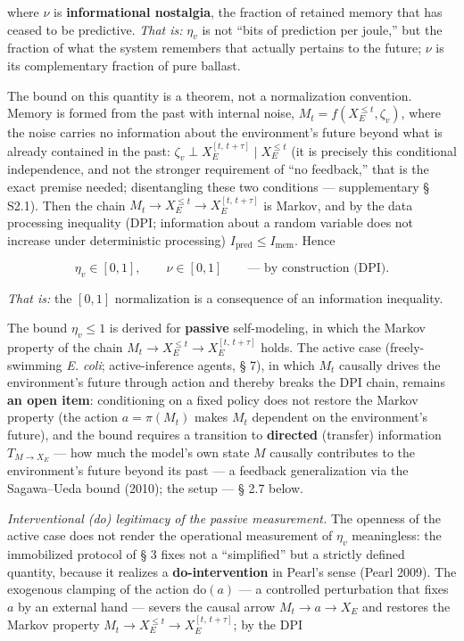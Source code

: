 \documentclass[pdflatex,sn-mathphys-ay]{sn-jnl}
\begin{document}
where \(\nu\) is \textbf{informational nostalgia}, the fraction of retained memory that has ceased to be predictive. \emph{That is:} \(\eta_v\) is not ``bits of prediction per joule,'' but the fraction of what the system remembers that actually pertains to the future; \(\nu\) is its complementary fraction of pure ballast.

The bound on this quantity is a theorem, not a normalization convention. Memory is formed from the past with internal noise, \(M_t = f(X_E^{\le t}, \zeta_v)\), where the noise carries no information about the environment's future beyond what is already contained in the past: \(\zeta_v \perp X_E^{[t,\,t+\tau]} \mid X_E^{\le t}\) (it is precisely this conditional independence, and not the stronger requirement of ``no feedback,'' that is the exact premise needed; disentangling these two conditions --- supplementary § S2.1). Then the chain \(M_t \to X_E^{\le t} \to X_E^{[t,\,t+\tau]}\) is Markov, and by the data processing inequality (DPI; information about a random variable does not increase under deterministic processing) \(I_{\text{pred}} \le I_{\text{mem}}\). Hence

\[\eta_v \in [0, 1], \qquad \nu \in [0, 1] \qquad \text{— by construction (DPI).}\]

\emph{That is:} the \([0, 1]\) normalization is a consequence of an information inequality.

The bound \(\eta_v \le 1\) is derived for \textbf{passive} self-modeling, in which the Markov property of the chain \(M_t \to X_E^{\le t} \to X_E^{[t,\,t+\tau]}\) holds. The active case (freely-swimming \emph{E. coli}; active-inference agents, § 7), in which \(M_t\) causally drives the environment's future through action and thereby breaks the DPI chain, remains \textbf{an open item}: conditioning on a fixed policy does not restore the Markov property (the action \(a = \pi(M_t)\) makes \(M_t\) dependent on the environment's future), and the bound requires a transition to \textbf{directed} (transfer) information \(T_{M \to X_E}\) --- how much the model's own state \(M\) causally contributes to the environment's future beyond its past --- a feedback generalization via the Sagawa--Ueda bound (2010); the setup --- § 2.7 below.

\emph{Interventional (do) legitimacy of the passive measurement.} The openness of the active case does not render the operational measurement of \(\eta_v\) meaningless: the immobilized protocol of § 3 fixes not a ``simplified'' but a strictly defined quantity, because it realizes a \textbf{do-intervention} in Pearl's sense (Pearl 2009). The exogenous clamping of the action \(\mathrm{do}(a)\) --- a controlled perturbation that fixes \(a\) by an external hand --- severs the causal arrow \(M_t \to a \to X_E\) and restores the Markov property \(M_t \to X_E^{\le t} \to X_E^{[t,\,t+\tau]}\); by the DPI
\end{document}
